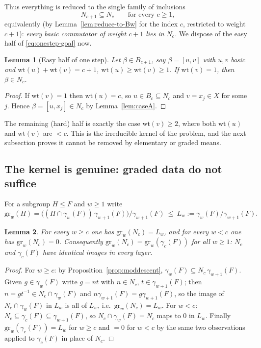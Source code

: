 \documentclass{amsart}
\newtheorem{lemma}{Lemma}
\theoremstyle{definition}
\theoremstyle{remark}
\begin{document}
\noindent
Thus everything is reduced to the single family of inclusions
\begin{equation}\label{eq:onestep-goal}
N_{c+1}\subseteq N_c\qquad\text{for every }c\ge1,
\end{equation}
equivalently (by Lemma~\ref{lem:reduce-to-Bw} for the index $c$, restricted to
weight $c+1$): \emph{every basic commutator of weight $c+1$ lies in $N_c$.} We
dispose of the easy half of \eqref{eq:onestep-goal} now.

\begin{lemma}[Easy half of one step]\label{lem:easy-half}
Let $\beta\in B_{c+1}$, say $\beta=[u,v]$ with $u,v$ basic and
$\mathrm{wt}(u)+\mathrm{wt}(v)=c+1$, $\mathrm{wt}(u)\ge\mathrm{wt}(v)\ge1$. If
$\mathrm{wt}(v)=1$, then $\beta\in N_c$.
\end{lemma}

\begin{proof}
If $\mathrm{wt}(v)=1$ then $\mathrm{wt}(u)=c$, so $u\in B_c\subseteq N_c$ and
$v=x_j\in X$ for some $j$. Hence $\beta=[u,x_j]\in N_c$ by Lemma~\ref{lem:caseA}.
\end{proof}

\noindent
The remaining (hard) half is exactly the case $\mathrm{wt}(v)\ge2$, where both
$\mathrm{wt}(u)$ and $\mathrm{wt}(v)$ are $<c$. This is the irreducible kernel of
the problem, and the next subsection proves it cannot be removed by elementary or
graded means.

\subsection{The kernel is genuine: graded data do not suffice}

For a subgroup $H\le F$ and $w\ge1$ write
\[
\mathrm{gr}_w(H)=\big((H\cap\gamma_w(F))\,\gamma_{w+1}(F)\big)/\gamma_{w+1}(F)
\ \le\ L_w:=\gamma_w(F)/\gamma_{w+1}(F).
\]

\begin{lemma}\label{lem:gradedNc}
For every $w\ge c$ one has $\mathrm{gr}_w(N_c)=L_w$, and for every $w<c$ one has
$\mathrm{gr}_w(N_c)=0$. Consequently $\mathrm{gr}_w(N_c)=\mathrm{gr}_w(\gamma_c(F))$
for all $w\ge1$: $N_c$ and $\gamma_c(F)$ have identical images in every layer.
\end{lemma}

\begin{proof}
For $w\ge c$: by Proposition~\ref{prop:moddescent}, $\gamma_w(F)\subseteq
N_c\,\gamma_{w+1}(F)$. Given $g\in\gamma_w(F)$ write $g=n t$ with $n\in N_c$,
$t\in\gamma_{w+1}(F)$; then $n=g t^{-1}\in N_c\cap\gamma_w(F)$ and
$n\gamma_{w+1}(F)=g\gamma_{w+1}(F)$, so the image of $N_c\cap\gamma_w(F)$ in $L_w$
is all of $L_w$, i.e.\ $\mathrm{gr}_w(N_c)=L_w$. For $w<c$:
$N_c\subseteq\gamma_c(F)\subseteq\gamma_{w+1}(F)$, so $N_c\cap\gamma_w(F)=N_c$ maps
to $0$ in $L_w$. Finally $\mathrm{gr}_w(\gamma_c(F))=L_w$ for $w\ge c$ and $=0$ for
$w<c$ by the same two observations applied to $\gamma_c(F)$ in place of $N_c$.
\end{proof}
\end{document}
